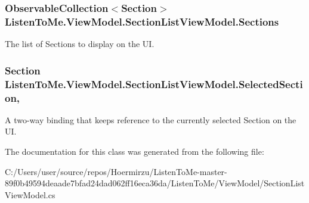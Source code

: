 \subsubsection[{\texorpdfstring{Sections}{Sections}}]{\setlength{\rightskip}{0pt plus 5cm}Observable\+Collection$<$Section$>$ Listen\+To\+Me.\+View\+Model.\+Section\+List\+View\+Model.\+Sections\hspace{0.3cm}{\ttfamily [get]}}\hypertarget{class_listen_to_me_1_1_view_model_1_1_section_list_view_model_adf81e04a9788a1c5372d0cf517282fea}{}\label{class_listen_to_me_1_1_view_model_1_1_section_list_view_model_adf81e04a9788a1c5372d0cf517282fea}


The list of Sections to display on the UI. 

\subsubsection[{\texorpdfstring{Selected\+Section}{SelectedSection}}]{\setlength{\rightskip}{0pt plus 5cm}Section Listen\+To\+Me.\+View\+Model.\+Section\+List\+View\+Model.\+Selected\+Section\hspace{0.3cm}{\ttfamily [get]}, {\ttfamily [set]}}\hypertarget{class_listen_to_me_1_1_view_model_1_1_section_list_view_model_a75f26037abfa359ad884df4fd17a9409}{}\label{class_listen_to_me_1_1_view_model_1_1_section_list_view_model_a75f26037abfa359ad884df4fd17a9409}


A two-\/way binding that keeps reference to the currently selected Section on the UI. 



The documentation for this class was generated from the following file\+:\begin{DoxyCompactItemize}
\item 
C\+:/\+Users/user/source/repos/\+Hoermirzu/\+Listen\+To\+Me-\/master-\/89f0b49594deaade7bfad24dad062ff16eca36da/\+Listen\+To\+Me/\+View\+Model/Section\+List\+View\+Model.\+cs\end{DoxyCompactItemize}
